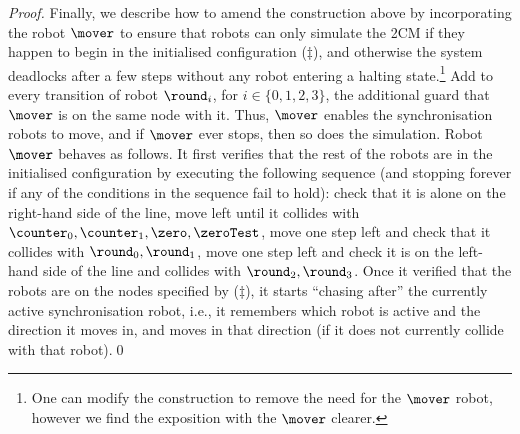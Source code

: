 \begin{proof}


Finally, we describe how to amend the construction above by incorporating the robot $\mover$ to ensure that robots can only simulate the 2CM if they happen to begin in the initialised configuration ($\ddagger$), and otherwise the system deadlocks after a few steps without any robot entering a halting state.\footnote{One can modify the construction to remove the need for the $\mover$ robot, however we find the exposition with the $\mover$ clearer.}  Add to every transition of robot $\round_i$, for $i \in \{0,1,2,3\}$, the additional guard that $\mover$ is on the same node with it. Thus, $\mover$ enables the synchronisation robots to move, and if $\mover$ ever stops, then so does the simulation. Robot $\mover$ behaves as follows. It first verifies that the rest of the robots are in the initialised configuration by executing the following sequence (and stopping forever if any of the conditions in the sequence fail to hold): check that it is alone on the right-hand side of the line, move left until it collides with $\counter_0,\counter_1,\zero,\zeroTest$, move one step left and check that it collides with $\round_0,\round_1$, move one step left and check it is on the left-hand side of the line and collides with $\round_2,\round_3$. Once it verified that the robots are on the nodes specified by ($\ddagger$), it starts ``chasing after'' the currently active synchronisation robot, i.e., it remembers which robot is active and the direction it moves in, and moves in that direction (if it does not currently collide with that robot).\qed
\end{proof}

